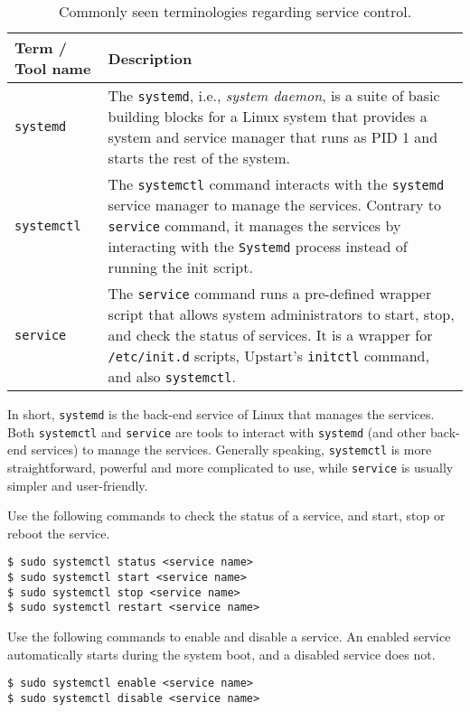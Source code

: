 \begin{table}
	\centering \caption{Commonly seen terminologies regarding service control.}\label{ch:sa:tab:servicecontroltools}
	\begin{tabularx}{\textwidth}{lX}
		\hline
		Term / Tool name & Description \\ \hline
		\verb|systemd| & The \verb|systemd|, i.e., \textit{system daemon}, is a suite of basic building blocks for a Linux system that provides a system and service manager that runs as PID 1 and starts the rest of the system.  \\ \hdashline
		\verb|systemctl| & The \verb|systemctl| command interacts with the \verb|systemd| service manager to manage the services. Contrary to \verb|service| command, it manages the services by interacting with the \verb|Systemd| process instead of running the init script.  \\ \hdashline
		\verb|service| & The \verb|service| command runs a pre-defined wrapper script that allows system administrators to start, stop, and check the status of services. It is a wrapper for \verb|/etc/init.d| scripts, Upstart's \verb|initctl| command, and also \verb|systemctl|. \\ \hline
	\end{tabularx}
\end{table}

In short, \verb|systemd| is the back-end service of Linux that manages the services. Both \verb|systemctl| and \verb|service| are tools to interact with \verb|systemd| (and other back-end services) to manage the services. Generally speaking, \verb|systemctl| is more straightforward, powerful and more complicated to use, while \verb|service| is usually simpler and user-friendly.

Use the following commands to check the status of a service, and start, stop or reboot the service.
\begin{lstlisting}
$ sudo systemctl status <service name>
$ sudo systemctl start <service name>
$ sudo systemctl stop <service name>
$ sudo systemctl restart <service name>
\end{lstlisting}

Use the following commands to enable and disable a service. An enabled service automatically starts during the system boot, and a disabled service does not.
\begin{lstlisting}
$ sudo systemctl enable <service name>
$ sudo systemctl disable <service name>
\end{lstlisting}

